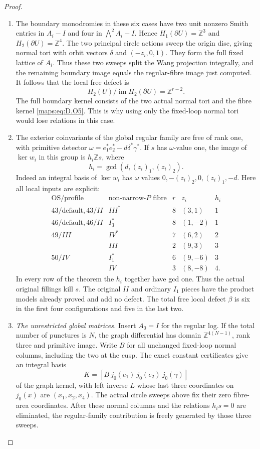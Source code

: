 \begin{proof}
\begin{enumerate}[label=\arabic*.,leftmargin=*]
\item The boundary monodromies in these six cases have two
unit nonzero Smith entries in $A_i-I$ and four in
$\bigwedge^2A_i-I$. Hence $H_1(\partial U)=\mathbb Z^3$
and $H_2(\partial U)=\mathbb Z^4$.
The two principal circle actions sweep the origin
disc, giving normal tori with orbit vectors
$\delta$ and $(-z_i,0,1)$. They form the full fixed
lattice of $A_i$. Thus these two sweeps split the
Wang projection integrally, and the remaining
boundary image equals the regular-fibre image just
computed. It follows that the local free defect is
\[
                H_2(U)/\operatorname{im}H_2(\partial U)
                         =\mathbb Z^{r-2}.
 \tag{D.O6}\label{maps:eq:D.O6}
\]
The full boundary kernel consists of the two actual
normal tori and the fibre kernel \eqref{maps:eq:D.O5}. This is why
using only the fixed-loop normal tori would lose
relations in this case.

\item The exterior coinvariants of the global regular family
are free of rank one, with primitive detector
$\omega=e_1^*e_2^*-d\delta^*\gamma^*$.
If $s$ has $\omega$-value one, the image of $\ker w_i$
in this group is $h_i\mathbb Zs$, where
\[
                  h_i=\gcd(d,(z_i)_1,(z_i)_2).
\]
Indeed an integral basis of $\ker w_i$ has $\omega$
values $0,-(z_i)_2,0,(z_i)_1,-d$.
Here all local inputs are explicit:
\[
\begin{array}{c|c|r|r|r}
 \mathrm{OS/profile}&\text{non-narrow-}P\text{ fibre}
       &r&z_i&h_i\\\hline
 43/\mathrm{default},43/II&III^*&8&(3,1)&1\\
 46/\mathrm{default},46/II&I_3^*&8&(1,-2)&1\\
 49/III&IV^*&7&(6,2)&2\\
       &III&2&(9,3)&3\\
 50/IV&I_1^*&6&(9,-6)&3\\
      &IV&3&(8,-8)&4.
\end{array}
\tag{D.O7}\label{maps:eq:D.O7}
\]
In every row of the theorem the $h_i$ together have gcd
one. Thus the actual original fillings kill $s$.
The original $II$ and ordinary $I_1$ pieces have the
product models already proved and add no defect.
The total free local defect $\beta$ is six in the first
four configurations and five in the last two.

\item \emph{The unrestricted global matrices.}
Insert $A_0=I$ for the regular log. If the total number
of punctures is $N$, the graph differential has domain
$\mathbb Z^{4(N-1)}$, rank three and primitive image.
Write $B$ for all unchanged fixed-loop normal columns,
including the two at the cusp. The exact constant
certificates give an integral basis
\[
 K=[B\ j_0(e_1)\ j_0(e_2)\ j_0(\gamma)]
\]
of the graph kernel, with left inverse $L$ whose last
three coordinates on $j_0(x)$ are $(x_1,x_2,x_4)$.
The actual circle sweeps above fix their zero fibre-area
coordinates. After these normal columns and the relations
$h_is=0$ are eliminated, the regular-family contribution
is freely generated by those three sweeps.


\end{enumerate}
\end{proof}
